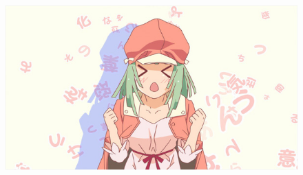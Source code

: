 \documentclass[a4paper, 12pt, oneside, landscape]{article}
\begin{document}
    \begin{figure}[ht]
        \centering
        \includegraphics{renai.png}
    \end{figure}
\end{document}

